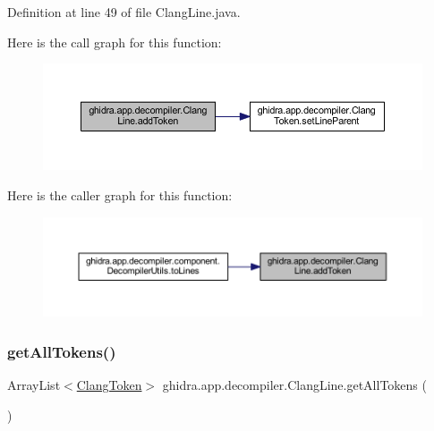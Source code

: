Definition at line 49 of file Clang\+Line.\+java.

Here is the call graph for this function\+:
\nopagebreak
\begin{figure}[H]
\begin{center}
\leavevmode
\includegraphics[width=350pt]{classghidra_1_1app_1_1decompiler_1_1_clang_line_a98375c4be1990b582f3ec1bd9bd6e5d5_cgraph}
\end{center}
\end{figure}
Here is the caller graph for this function\+:
\nopagebreak
\begin{figure}[H]
\begin{center}
\leavevmode
\includegraphics[width=350pt]{classghidra_1_1app_1_1decompiler_1_1_clang_line_a98375c4be1990b582f3ec1bd9bd6e5d5_icgraph}
\end{center}
\end{figure}
\mbox{\label{classghidra_1_1app_1_1decompiler_1_1_clang_line_acd7202834ac518fee358031b56e82d79}} 
\subsubsection{\texorpdfstring{getAllTokens()}{getAllTokens()}}
{\footnotesize\ttfamily Array\+List$<$\mbox{\hyperlink{classghidra_1_1app_1_1decompiler_1_1_clang_token}{Clang\+Token}}$>$ ghidra.\+app.\+decompiler.\+Clang\+Line.\+get\+All\+Tokens (\begin{DoxyParamCaption}{ }\end{DoxyParamCaption})\hspace{0.3cm}{\ttfamily [inline]}}



